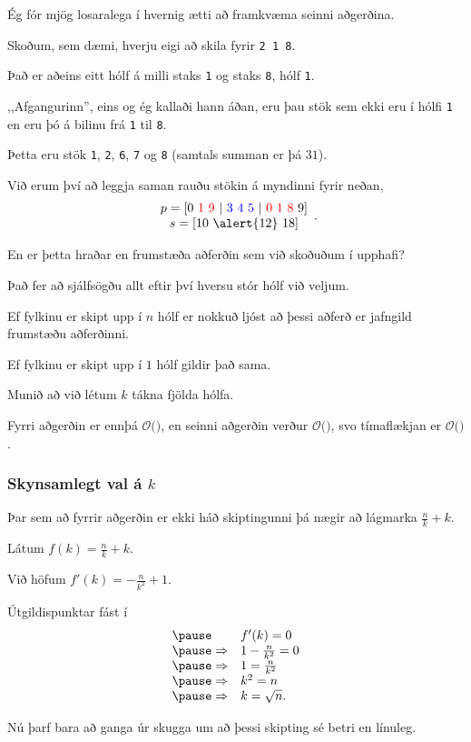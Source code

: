 {
	{
		\item<1-> Ég fór mjög losaralega í hvernig ætti að framkvæma seinni aðgerðina.
		\item<2-> Skoðum, sem dæmi, hverju eigi að skila fyrir \texttt{2 1 8}.
		\item<3-> Það er aðeins eitt hólf á milli staks \texttt{1} og staks \texttt{8}, hólf \texttt{1}.
		\item<4-> ,,Afgangurinn'', eins og ég kallaði hann áðan, eru þau stök sem ekki eru í hólfi \texttt{1}
			en eru þó á bilinu frá \texttt{1} til \texttt{8}.
		\item<5-> Þetta eru stök \texttt{1}, \texttt{2}, \texttt{6}, \texttt{7} og \texttt{8} (samtals summan er þá $31$).
		\item<6-> Við erum því að leggja saman rauðu stökin á myndinni fyrir neðan,
			\[
			\begin {array}{c}
				p = [0\ {\color{red} 1 \ 9\ }|\ {\color{blue}3\ 4\ 5\ } |\ {\color{red} 0\ 1\ 8\ } 9]\\ 
				s = [10\ \alert{12}\ 18]
		\end {array}.
			\]
	}
}

{
	{
		\item<1-> En er þetta hraðar en frumstæða aðferðin sem við skoðuðum í upphafi?
		\item<2-> Það fer að sjálfsögðu allt eftir því hversu stór hólf við veljum.
		\item<3-> Ef fylkinu er skipt upp í $n$ hólf er nokkuð ljóst að þessi aðferð er jafngild frumstæðu aðferðinni.
		\item<4-> Ef fylkinu er skipt upp í $1$ hólf gildir það sama.
		\item<5-> Munið að við létum $k$ tákna fjölda hólfa.
		\item<6-> Fyrri aðgerðin er ennþá $\mathcal{O}($\onslide<7->{$\,1\,$}$)$,
			en seinni aðgerðin verður $\mathcal{O}($\onslide<8->{$n/k + k$}$)$,
			svo tímaflækjan er $\mathcal{O}($\onslide<9->{$qn/k + qk$}$)$.
	}
}

{
	\frametitle{Skynsamlegt val á $k$}
	{
		\item Þar sem að fyrrir aðgerðin er ekki háð skiptingunni þá nægir að lágmarka $\frac{n}{k} + k$.
		\pause\item Látum $f(k) = \frac{n}{k} + k$.
		\pause\item Við höfum $f'(k) = -\frac{n}{k^2} + 1$.
		\pause\item Útgildispunktar fást í
			\[
				\begin{array}{l l}
				\pause& f'(k) = 0\\
				\pause\Rightarrow & 1 - \frac{n}{k^2} = 0\\
				\pause\Rightarrow & 1 = \frac{n}{k^2}\\
				\pause\Rightarrow & k^2 = n\\
				\pause\Rightarrow & k = \sqrt{n}.
			\end{array}
			\]
		\pause\item Nú þarf bara að ganga úr skugga um að þessi skipting sé betri en línuleg.
}
}

